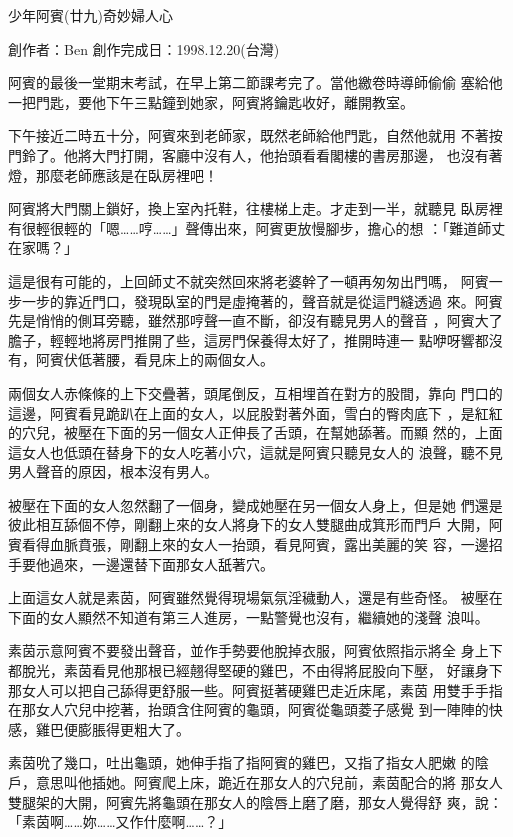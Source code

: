 



少年阿賓(廿九)奇妙婦人心

創作者：Ben
創作完成日：1998.12.20(台灣)


阿賓的最後一堂期末考試，在早上第二節課考完了。當他繳卷時導師偷偷
塞給他一把門匙，要他下午三點鐘到她家，阿賓將鑰匙收好，離開教室。

下午接近二時五十分，阿賓來到老師家，既然老師給他門匙，自然他就用
不著按門鈴了。他將大門打開，客廳中沒有人，他抬頭看看閣樓的書房那邊，
也沒有著燈，那麼老師應該是在臥房裡吧！

阿賓將大門關上鎖好，換上室內托鞋，往樓梯上走。才走到一半，就聽見
臥房裡有很輕很輕的「嗯……哼……」聲傳出來，阿賓更放慢腳步，擔心的想
：「難道師丈在家嗎？」

這是很有可能的，上回師丈不就突然回來將老婆幹了一頓再匆匆出門嗎，
阿賓一步一步的靠近門口，發現臥室的門是虛掩著的，聲音就是從這門縫透過
來。阿賓先是悄悄的側耳旁聽，雖然那哼聲一直不斷，卻沒有聽見男人的聲音
，阿賓大了膽子，輕輕地將房門推開了些，這房門保養得太好了，推開時連一
點咿呀響都沒有，阿賓伏低著腰，看見床上的兩個女人。

兩個女人赤條條的上下交疊著，頭尾倒反，互相埋首在對方的股間，靠向
門口的這邊，阿賓看見跪趴在上面的女人，以屁股對著外面，雪白的臀肉底下
，是紅紅的穴兒，被壓在下面的另一個女人正伸長了舌頭，在幫她舔著。而顯
然的，上面這女人也低頭在替身下的女人吃著小穴，這就是阿賓只聽見女人的
浪聲，聽不見男人聲音的原因，根本沒有男人。

被壓在下面的女人忽然翻了一個身，變成她壓在另一個女人身上，但是她
們還是彼此相互舔個不停，剛翻上來的女人將身下的女人雙腿曲成箕形而門戶
大開，阿賓看得血脈賁張，剛翻上來的女人一抬頭，看見阿賓，露出美麗的笑
容，一邊招手要他過來，一邊還替下面那女人舐著穴。

上面這女人就是素茵，阿賓雖然覺得現場氣氛淫穢動人，還是有些奇怪。
被壓在下面的女人顯然不知道有第三人進房，一點警覺也沒有，繼續她的淺聲
浪叫。

素茵示意阿賓不要發出聲音，並作手勢要他脫掉衣服，阿賓依照指示將全
身上下都脫光，素茵看見他那根已經翹得堅硬的雞巴，不由得將屁股向下壓，
好讓身下那女人可以把自己舔得更舒服一些。阿賓挺著硬雞巴走近床尾，素茵
用雙手手指在那女人穴兒中挖著，抬頭含住阿賓的龜頭，阿賓從龜頭菱子感覺
到一陣陣的快感，雞巴便膨脹得更粗大了。

素茵吮了幾口，吐出龜頭，她伸手指了指阿賓的雞巴，又指了指女人肥嫩
的陰戶，意思叫他插她。阿賓爬上床，跪近在那女人的穴兒前，素茵配合的將
那女人雙腿架的大開，阿賓先將龜頭在那女人的陰唇上磨了磨，那女人覺得舒
爽，說：「素茵啊……妳……又作什麼啊……？」

